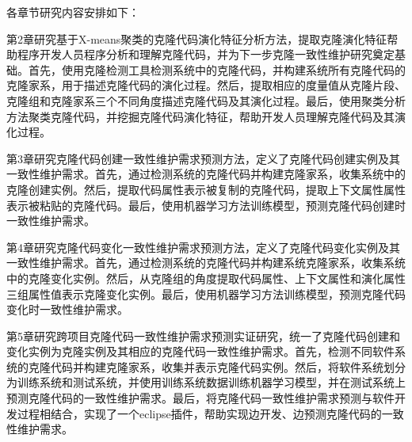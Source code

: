 


各章节研究内容安排如下：

第2章研究基于X-means聚类的克隆代码演化特征分析方法，提取克隆演化特征帮助程序开发人员程序分析和理解克隆代码，并为下一步克隆一致性维护研究奠定基础。首先，使用克隆检测工具检测系统中的克隆代码，并构建系统所有克隆代码的克隆家系，用于描述克隆代码的演化过程。然后，提取相应的度量值从克隆片段、克隆组和克隆家系三个不同角度描述克隆代码及其演化过程。最后，使用聚类分析方法聚类克隆代码，并挖掘克隆代码演化特征，帮助开发人员理解克隆代码及其演化过程。

第3章研究克隆代码创建一致性维护需求预测方法，定义了克隆代码创建实例及其一致性维护需求。首先，通过检测系统的克隆代码并构建克隆家系，收集系统中的克隆创建实例。然后，提取代码属性表示被复制的克隆代码，提取上下文属性属性表示被粘贴的克隆代码。最后，使用机器学习方法训练模型，预测克隆代码创建时一致性维护需求。

第4章研究克隆代码变化一致性维护需求预测方法，定义了克隆代码变化实例及其一致性维护需求。首先，通过检测系统的克隆代码并构建系统克隆家系，收集系统中的克隆变化实例。然后，从克隆组的角度提取代码属性、上下文属性和演化属性三组属性值表示克隆变化实例。最后，使用机器学习方法训练模型，预测克隆代码变化时一致性维护需求。

第5章研究跨项目克隆代码一致性维护需求预测实证研究，统一了克隆代码创建和变化实例为克隆实例及其相应的克隆代码一致性维护需求。首先，检测不同软件系统的克隆代码并构建克隆家系，收集并表示克隆代码实例。然后，将软件系统划分为训练系统和测试系统，并使用训练系统数据训练机器学习模型，并在测试系统上预测克隆代码的一致性维护需求。最后，将克隆代码一致性维护需求预测与软件开发过程相结合，实现了一个eclipse插件，帮助实现边开发、边预测克隆代码的一致性维护需求。
